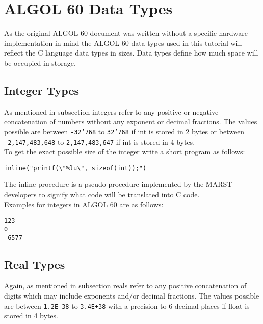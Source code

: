 \documentclass{article}
\begin{document}
\newpage

\section{ALGOL 60 Data Types} \label{datatypes}
As the original ALGOL 60 document was written without a specific hardware implementation in mind the ALGOL 60 data types used in this tutorial will reflect the C language data types in sizes. Data types define how much space will be occupied in storage.

\subsection{Integer Types}
As mentioned in subsection  integers refer to any positive or negative concatenation of numbers without any exponent or decimal fractions. The values possible are between \texttt{-32'768} to \texttt{32'768} if int is stored in 2 bytes or between \texttt{-2,147,483,648} to \texttt{2,147,483,647} if int is stored in 4 bytes.\\

To get the exact possible size of the integer write a short program as follows:\\

\begin{lstlisting}[language={[60]algol}]
inline("printf(\"%lu\", sizeof(int));")
\end{lstlisting}

The inline procedure is a pseudo procedure implemented by the MARST developers to signify what code will be translated into C code. \\

Examples for integers in ALGOL 60 are as follows:\\

\begin{lstlisting}[language={[60]algol}]
123
0
-6577
\end{lstlisting}

\subsection{Real Types}
Again, as mentioned in subsection  reals refer to any positive concatenation of digits which may include exponents and/or decimal fractions. The values possible are between \texttt{1.2E-38} to \texttt{3.4E+38} with a precision to 6 decimal places if float is stored in 4 bytes.\\
\end{document}
